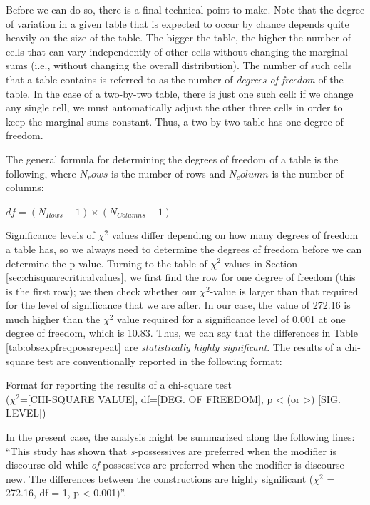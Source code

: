 Before we can do so, there is a final technical point to make. Note that the degree of variation in a given table that is expected to occur by chance depends quite heavily on the size of the table. The bigger the table, the higher the number of cells that can vary independently of other cells without changing the marginal sums (i.e., without changing the overall distribution). The number of such cells that a table contains is referred to as the number of \textit{degrees of freedom} of the table. In the case of a two-by-two table, there is just one such cell: if we change any single cell, we must automatically adjust the other three cells in order to keep the marginal sums constant. Thus, a two-by-two table has one degree of freedom. 

The general formula for determining the degrees of freedom of a table is the following, where $N_rows$ is the number of rows and $N_column$ is the number of columns:

\begin{exe}
\ex $\displaystyle{df = (N_{Rows} - 1) \times (N_{Columns} - 1)}$
\label{ex:formuladf}
\end{exe}

Significance levels of $\chi^2$ values differ depending on how many degrees of freedom a table has, so we always need to determine the degrees of freedom before we can determine the p-value. Turning to the table of $\chi^2$ values in Section \ref{sec:chisquarecriticalvalues}, we first find the row for one degree of freedom (this is the first row); we then check whether our $\chi^2$-value is larger than that required for the level of significance that we are after. In our case, the value of 272.16 is much higher than the $\chi^2$ value required for a significance level of 0.001 at one degree of freedom, which is 10.83. Thus, we can say that the differences in Table \ref{tab:obsexpfreqpossrepeat} are \textit{statistically highly significant}. The results of a chi-square test are conventionally reported in the following format:

\begin{exe}
\ex Format for reporting the results of a chi-square test\\
($\chi^2$=[CHI-SQUARE VALUE], df=[DEG. OF FREEDOM], p < (or >) [SIG. LEVEL])
\label{ex:reportingchisquare}
\end{exe}

In the present case, the analysis might be summarized along the following lines: ``This study has shown that \textit{s}-possessives are preferred when the modifier is discourse-old while \textit{of}-possessives are preferred when the modifier is discourse-new. The differences between the constructions are highly significant ($\chi^2$ = 272.16, df = 1, p < 0.001)''.

